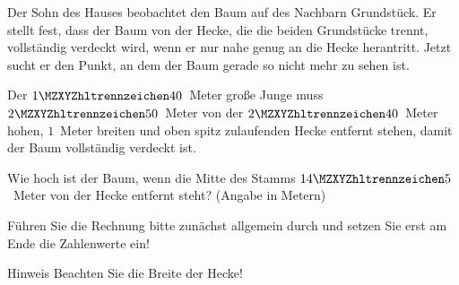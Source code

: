 \begin{MExercises}
\begin{MExercise}
Der Sohn des Hauses beobachtet den Baum auf des Nachbarn Grundst\"uck. Er 
stellt fest, dass der Baum von der Hecke, die die beiden Grundst\"ucke trennt,
vollst\"andig verdeckt wird, wenn er nur nahe genug an die Hecke herantritt.
Jetzt sucht er den Punkt, an dem der Baum gerade so nicht mehr zu sehen ist.

Der $\MZahl{1}{40}$~Meter gro\ss e Junge muss $\MZahl{2}{50}$~Meter von der 
$\MZahl{2}{40}$~Meter hohen, $1$~Meter breiten und oben spitz zulaufenden 
Hecke entfernt stehen, damit der Baum vollst\"andig verdeckt ist.

Wie hoch ist der Baum, wenn die Mitte des Stamms $\MZahl{14}{5}$~Meter von der Hecke entfernt steht?
\ifttm (Angabe in Metern) \else\relax\fi

F\"uhren Sie die Rechnung bitte zun\"achst allgemein durch und setzen Sie erst
am Ende die Zahlenwerte ein!

\begin{MHint}{Hinweis}
Beachten Sie die Breite der Hecke!
\end{MHint}


\end{MExercise}
\end{MExercises}
